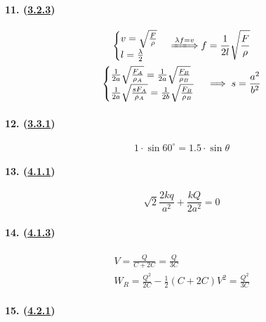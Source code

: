 \paragraph{11. (\hyperref[subsec:3.2.3]{3.2.3})}

\begin{gather*}
    \begin{cases}
        v=\sqrt{\frac{F}{\rho}}\\
        l=\frac{\lambda}{2}
    \end{cases}\xLongrightarrow{\lambda f=v}f=\frac{1}{2l}\sqrt{\frac{F}{\rho}}\\
    \begin{cases}
        \frac{1}{2a}\sqrt{\frac{F_A}{\rho_A}}=\frac{1}{2a}\sqrt{\frac{F_B}{\rho_B}}\\
        \frac{1}{2a}\sqrt{\frac{sF_A}{\rho_A}}=\frac{1}{2b}\sqrt{\frac{F_B}{\rho_B}}
    \end{cases}\implies s=\frac{a^2}{b^2}
\end{gather*}

\paragraph{12. (\hyperref[subsec:3.3.1]{3.3.1})}

\begin{equation*}
    1\cdot\sin60^\circ=1.5\cdot\sin\theta
\end{equation*}

\paragraph{13. (\hyperref[subsec:4.1.1]{4.1.1})}

\begin{equation*}
    \sqrt{2}\frac{2kq}{a^2}+\frac{kQ}{2a^2}=0
\end{equation*}

\paragraph{14. (\hyperref[subsec:4.1.3]{4.1.3})}

\begin{gather*}
    V=\frac{Q}{C+2C}=\frac{Q}{3C}\\
    W_R=\frac{Q^2}{2C}-\frac12(C+2C)V^2=\frac{Q^2}{3C}
\end{gather*}

\paragraph{15. (\hyperref[subsec:4.2.1]{4.2.1})}

